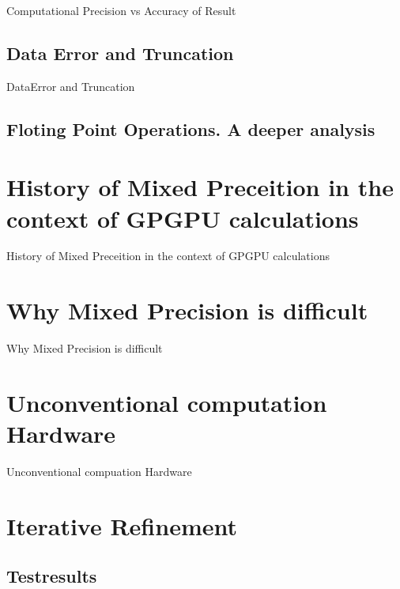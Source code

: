 \documentclass[10pt]{beamer}
\begin{document}
\begin{frame}{Computational Precision vs Accuracy of Result}

\end{frame}

\subsection{Data Error and Truncation}
\begin{frame}{DataError and Truncation}
\end{frame}


\subsection{Floting Point Operations. A deeper analysis}
\begin{frame}{}

\end{frame}

\section{History of Mixed Preceition in the context of GPGPU calculations}
\begin{frame}{History of Mixed Preceition in the context of GPGPU calculations}

\end{frame}

\section{Why Mixed Precision is difficult}
\begin{frame}{Why Mixed Precision is difficult}

\end{frame}

\section{Unconventional computation Hardware}
\begin{frame}{Unconventional compuation Hardware}

\end{frame}

\section{Iterative Refinement}

\subsection{Testresults}
\end{document}
